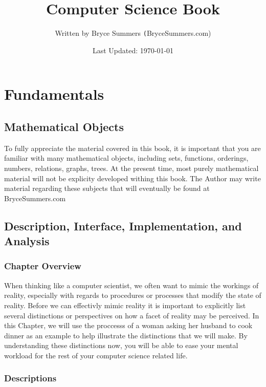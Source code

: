 \documentclass[12pt, letterpaper]{book}
\begin{document}
\title{\color{blue}Computer Science Book}
\author{Written by Bryce Summers \texttt(BryceSummers.com)}
\date{\color{red}Last Updated: \today}
\maketitle


\tableofcontents 


\part{Fundamentals}

\chapter{Mathematical Objects}

To fully appreciate the material covered in this book, it is important that you are familiar with many mathematical objects, including sets, functions, orderings, numbers, relations, graphs, trees. At the present time, most purely mathematical material will not be explicity developed withing this book. The Author may write material regarding these subjects that will eventually be found at BryceSummers.com

\chapter[Fundamental Distinctions]{Description, Interface, Implementation, and Analysis}

\section{Chapter Overview}

When thinking like a computer scientist, we often want to mimic the workings of reality, especially with regards to procedures or processes that modify the state of reality. Before we can effectivly mimic reality it is important to explicitly list several distinctions or perspectives on how a facet of reality may be perceived. In this Chapter, we will use the proccesss of a woman asking her husband to cook dinner as an example to help illustrate the distinctions that we will make. By understanding these distinctions now, you will be able to ease your mental workload for the rest of your computer science related life.

\section{Descriptions}
\end{document}
